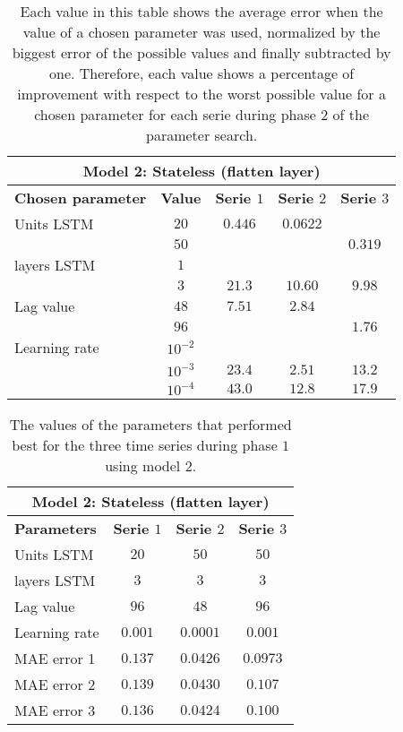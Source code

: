 \begin{table}[ht]
	\centering
	\begin{tabular}{@{}l||c|ccc@{}} \toprule
		\multicolumn{5}{c}{Model 2: Stateless (flatten layer)}\\\midrule\midrule
		\textbf{Chosen parameter}	& \textbf{Value} & \textbf{Serie $ 1 $} & \textbf{Serie $ 2 $} & \textbf{Serie $ 3 $}\\\midrule
		Units LSTM & $ 20 $ & $0.446 $&$ 0.0622 $  & \\
				   & $ 50 $  & 		  		&		   				& $0.319 $		\\\hline
		layers LSTM & $ 1 $ & 		&		   & 		\\
		            & $ 3 $ &  $21.3 $   	&$ 10.60 $  				& $9.98$\\\hline
		Lag value & $ 48 $ & $7.51 $&$ 2.84 $		   & \\
		            & $ 96 $ &          		& 		 & 	$1.76$	\\\hline
		Learning rate & $ 10^{-2} $ &       &		 & 		\\
		           & $  10^{-3} $ &$23.4 $    &$ 2.51$  			& $13.2$\\
		          & $  10^{-4} $ &$43.0 $		&$ 12.8$    	& $17.9$\\\bottomrule
		
	\end{tabular}
	\caption{Each value in this table shows the average error when the value of a chosen parameter was used, normalized by the biggest error of the possible values and finally subtracted by one. Therefore, each value shows a percentage of improvement with respect to the worst possible value for a chosen parameter for each serie during phase $ 2 $ of the parameter search.}
	\label{tab:relative_performance_parameters_phase_one_model_two}
\end{table}

\begin{table}[ht]
	\centering
	\begin{tabular}{@{}l|ccc@{}} \toprule
		\multicolumn{4}{c}{Model 2: Stateless (flatten layer)}\\\midrule\midrule
		\textbf{Parameters}	& \textbf{Serie $ 1 $} & \textbf{Serie $ 2 $} & \textbf{Serie $ 3 $}\\\midrule
		Units LSTM & $20 $&$ 50 $  & $50 $\\
		layers LSTM & $3 $&$ 3 $  & $3$\\
		Lag value & $96 $&$ 48$  & $96$\\
		Learning rate & $0.001 $&$ 0.0001$  & $0.001$\\\hline
		MAE error 1   & $ 0.137 $ & $ 0.0426 $ & $ 0.0973 $\\
		MAE error 2   & $ 0.139 $ & $ 0.0430 $ & $ 0.107 $\\
		MAE error 3   & $ 0.136 $ & $ 0.0424 $ & $ 0.100 $\\\bottomrule
	\end{tabular}
	\caption{The values of the parameters that performed best for the three time series during phase $ 1 $ using model $ 2 $.}
	\label{tab:best_performing_para_phase1_model2}
\end{table}



